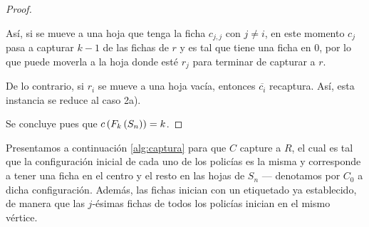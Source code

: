 \begin{proof}
\begin{enumerate}
\begin{enumerate}[a)]
            As\'i, si se mueve a una hoja que tenga la ficha $c_{j,j}$ con
            $j\neq i$, en este momento $c_j$ pasa a capturar $k-1$ de las fichas
            de $r$ y es tal que tiene una ficha en $0$, por lo que puede moverla
            a la hoja donde est\'e $r_j$ para terminar de capturar a $r$.

            De lo contrario, si $r_i$ se mueve a una hoja vac\'ia, entonces
            $\overline{c_i}$ recaptura. As\'i, esta instancia se reduce al caso
            2a).
        \end{enumerate}
    \end{enumerate}
    Se concluye pues que $c\left( F_k\left( S_n\right)\right)=k$.

\end{proof}

Presentamos a continuaci\'on \cref{alg:captura} para que $C$ capture a $R$, el
cual es tal que la configuraci\'on inicial de cada uno de los polic\'ias es la
misma y corresponde a tener una ficha en el centro y el resto en las hojas de
$S_n$ --- denotamos por $C_0$ a dicha configuraci\'on. Adem\'as, las fichas
inician con un etiquetado ya establecido, de manera que las $j$-\'esimas fichas
de todos los polic\'ias inician en el mismo v\'ertice.

\newpage

